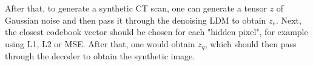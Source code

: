 After that, to generate a synthetic CT scan, one can generate a tensor $z$ of Gaussian noise and then pass it through the denoising LDM to obtain $z_e$. Next, the closest codebook vector should be chosen for each "hidden pixel", for example using L1, L2 or MSE. After that, one would obtain $z_q$, which should then pass through the decoder to obtain the synthetic image.









